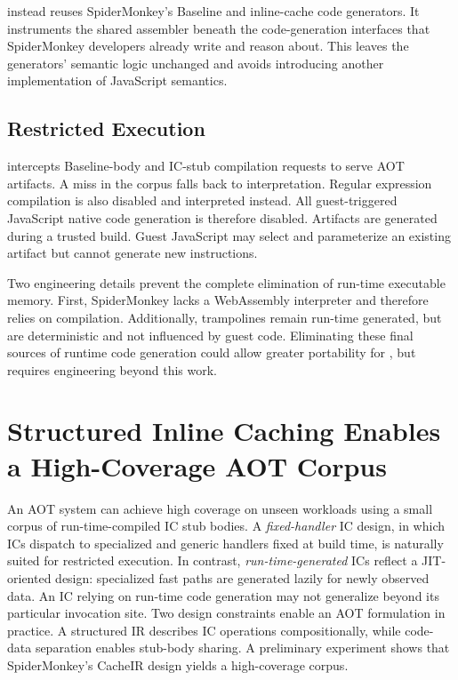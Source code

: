 \documentclass[sigplan,screen,review,anonymous]{acmart}
\newcommand{\AM}{\leavevmode{\sc AmberMonkey}}
\begin{document}
\AM{} instead reuses SpiderMonkey's Baseline and inline-cache code generators. It instruments the shared assembler beneath the code-generation interfaces that SpiderMonkey developers already write and reason about. This leaves the generators' semantic logic unchanged and avoids introducing another implementation of JavaScript semantics.

\subsection{Restricted Execution}
\label{sec:restricted-execution}
\AM{} intercepts Baseline-body and IC-stub compilation requests to serve AOT artifacts. A miss in the corpus falls back to interpretation. Regular expression compilation is also disabled and interpreted instead. All guest-triggered JavaScript native code generation is therefore disabled. Artifacts are generated during a trusted build. Guest JavaScript may select and parameterize an existing artifact but cannot generate new instructions.

Two engineering details prevent the complete elimination of run-time executable memory. First, SpiderMonkey lacks a WebAssembly interpreter and therefore relies on compilation. Additionally, trampolines remain run-time generated, but are deterministic and not influenced by guest code. Eliminating these final sources of runtime code generation could allow greater portability for \AM{}, but requires engineering beyond this work.

\section{Structured Inline Caching Enables a High-Coverage AOT Corpus}
\label{sec:sic}

An AOT system can achieve high coverage on unseen workloads using a small corpus of run-time-compiled IC stub bodies.
A \emph{fixed-handler} IC design, in which ICs dispatch to specialized and generic handlers fixed at build time, is naturally suited for restricted execution.
 In contrast, \emph{run-time-generated} ICs reflect a JIT-oriented design: specialized fast paths are generated lazily for newly observed data. An IC relying on run-time code generation may not generalize beyond its particular invocation site. Two design constraints enable an AOT formulation in practice. A structured IR describes IC operations compositionally, while code-data separation enables stub-body sharing. A preliminary experiment shows that SpiderMonkey's CacheIR design yields a high-coverage corpus.
\end{document}
